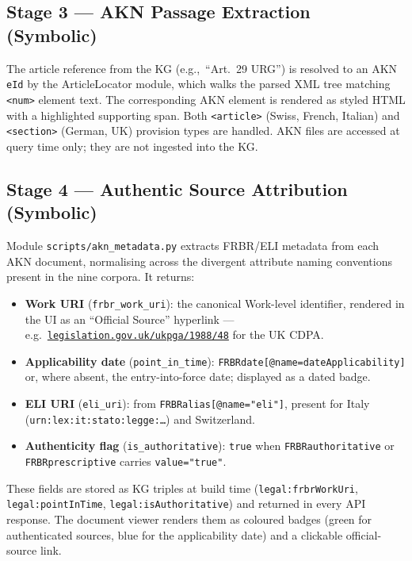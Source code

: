 \documentclass[12pt,a4paper]{article}
\begin{document}
\subsection{Stage 3 --- AKN Passage Extraction (Symbolic)}

The article reference from the KG (e.g.,\ ``Art.~29 URG'') is resolved to
an AKN \texttt{eId} by the ArticleLocator module, which walks the parsed
XML tree matching \texttt{<num>} element text. The corresponding AKN
element is rendered as styled HTML with a highlighted supporting span.
Both \texttt{<article>} (Swiss, French, Italian) and \texttt{<section>}
(German, UK) provision types are handled. AKN files are accessed at query
time only; they are not ingested into the KG.

\subsection{Stage 4 --- Authentic Source Attribution (Symbolic)}
\label{sec:frbr}

Module \texttt{scripts/akn\_metadata.py} extracts FRBR/ELI metadata from
each AKN document, normalising across the divergent attribute naming
conventions present in the nine corpora. It returns:

\begin{itemize}[leftmargin=1.4em]
  \item \textbf{Work URI} (\texttt{frbr\_work\_uri}): the canonical
        Work-level identifier, rendered in the UI as an ``Official Source''
        hyperlink --- e.g.\
        \href{https://www.legislation.gov.uk/ukpga/1988/48}%
             {\texttt{legislation.gov.uk/ukpga/1988/48}} for the UK CDPA.
  \item \textbf{Applicability date} (\texttt{point\_in\_time}):
        \texttt{FRBRdate[@name=dateApplicability]} or, where absent, the
        entry-into-force date; displayed as a dated badge.
  \item \textbf{ELI URI} (\texttt{eli\_uri}): from
        \texttt{FRBRalias[@name="eli"]}, present for Italy
        (\texttt{urn:lex:it:stato:legge:\ldots}) and Switzerland.
  \item \textbf{Authenticity flag} (\texttt{is\_authoritative}):
        \texttt{true} when \texttt{FRBRauthoritative} or
        \texttt{FRBRprescriptive} carries \texttt{value="true"}.
\end{itemize}

These fields are stored as KG triples at build time
(\texttt{legal:frbrWorkUri}, \texttt{legal:pointInTime},
\texttt{legal:isAuthoritative}) and returned in every API response. The
document viewer renders them as coloured badges (green for authenticated
sources, blue for the applicability date) and a clickable
official-source link.
\end{document}
